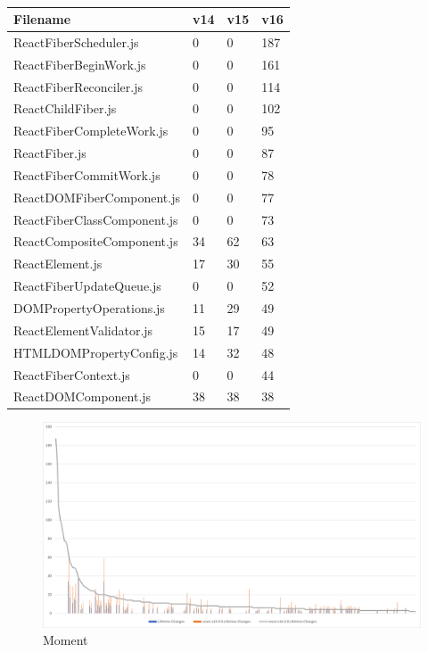 \begin{table}[h]
    \centering
    \begin{tabular}{l|l|l|l}
        Filename                    & v14 & v15 & v16 \\ \hline
        ReactFiberScheduler.js      & 0   & 0   & 187 \\
        ReactFiberBeginWork.js      & 0   & 0   & 161 \\
        ReactFiberReconciler.js     & 0   & 0   & 114 \\
        ReactChildFiber.js          & 0   & 0   & 102 \\
        ReactFiberCompleteWork.js   & 0   & 0   & 95  \\
        ReactFiber.js               & 0   & 0   & 87  \\
        ReactFiberCommitWork.js     & 0   & 0   & 78  \\
        ReactDOMFiberComponent.js   & 0   & 0   & 77  \\
        ReactFiberClassComponent.js & 0   & 0   & 73  \\
        ReactCompositeComponent.js  & 34  & 62  & 63  \\
        ReactElement.js             & 17  & 30  & 55  \\
        ReactFiberUpdateQueue.js    & 0   & 0   & 52  \\
        DOMPropertyOperations.js    & 11  & 29  & 49  \\
        ReactElementValidator.js    & 15  & 17  & 49  \\
        HTMLDOMPropertyConfig.js    & 14  & 32  & 48  \\
        ReactFiberContext.js        & 0   & 0   & 44  \\
        ReactDOMComponent.js        & 38  & 38  & 38
    \end{tabular}
    \caption{}
    \label{tab:react-all-changes}
\end{table}

\begin{figure}[H]
    \centering
    \includegraphics[width=1\textwidth]{images/react/react-all-changes.png}
    \caption{Moment}
    \label{fig:react-all-changes}
\end{figure}